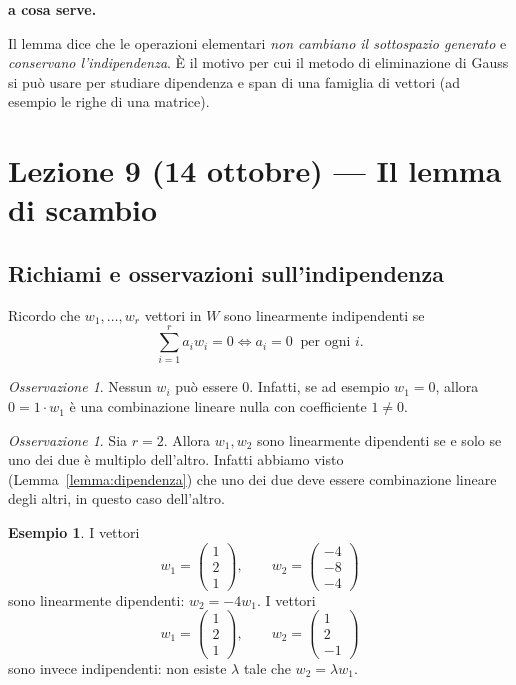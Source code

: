 \documentclass[11pt,a4paper]{article}
\theoremstyle{plain}
\theoremstyle{definition}
\newtheorem{esempio}[prop]{Esempio}
\theoremstyle{remark}
\newtheorem{oss}[prop]{Osservazione}
\begin{document}
\par\medskip
\noindent\textbf{a cosa serve.}\par

Il lemma dice che le operazioni elementari \emph{non cambiano il sottospazio generato} e \emph{conservano l'indipendenza}.
È il motivo per cui il metodo di eliminazione di Gauss si può usare per studiare dipendenza e span di una famiglia di vettori (ad esempio le righe di una matrice).
\par\medskip

\section{Lezione 9 (14 ottobre) --- Il lemma di scambio}

\subsection{Richiami e osservazioni sull'indipendenza}

Ricordo che $w_1,\dots,w_r$ vettori in $W$ sono linearmente indipendenti se
\[
  \sum_{i=1}^{r}a_iw_i=0 \iff a_i=0\ \text{ per ogni } i .
\]

\begin{oss}
Nessun $w_i$ può essere $0$. Infatti, se ad esempio $w_1=0$, allora $0=1\cdot w_1$ è una combinazione lineare nulla con coefficiente $1\neq0$.
\end{oss}

\begin{oss}
Sia $r=2$. Allora $w_1,w_2$ sono linearmente dipendenti se e solo se uno dei due è multiplo dell'altro.
Infatti abbiamo visto (Lemma~\ref{lemma:dipendenza}) che uno dei due deve essere combinazione lineare degli altri, in questo caso dell'altro.
\end{oss}

\begin{esempio}
I vettori
\[
  w_1=\begin{pmatrix}1\\2\\1\end{pmatrix},\qquad
  w_2=\begin{pmatrix}-4\\-8\\-4\end{pmatrix}
\]
sono linearmente dipendenti: $w_2=-4w_1$.
I vettori
\[
  w_1=\begin{pmatrix}1\\2\\1\end{pmatrix},\qquad
  w_2=\begin{pmatrix}1\\2\\-1\end{pmatrix}
\]
sono invece indipendenti: non esiste $\lambda$ tale che $w_2=\lambda w_1$.
\end{esempio}
\end{document}
